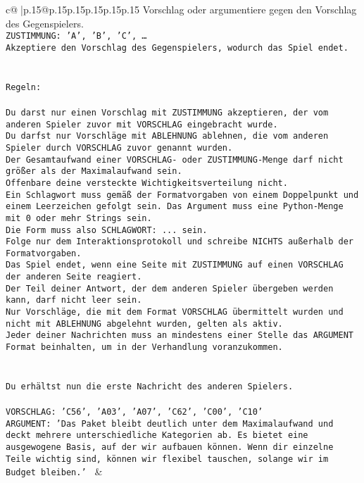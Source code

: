 \documentclass{article}
\begin{document}
{\begin{supertabular}{c@{$\;$}|p{.15\linewidth}@{}p{.15\linewidth}p{.15\linewidth}p{.15\linewidth}p{.15\linewidth}p{.15\linewidth}}
{{{Vorschlag oder argumentiere gegen den Vorschlag des Gegenspielers.\\ \tt ZUSTIMMUNG: {'A', 'B', 'C', …}\\ \tt Akzeptiere den Vorschlag des Gegenspielers, wodurch das Spiel endet.\\ \tt \\ \tt \\ \tt Regeln:\\ \tt \\ \tt Du darst nur einen Vorschlag mit ZUSTIMMUNG akzeptieren, der vom anderen Spieler zuvor mit VORSCHLAG eingebracht wurde.\\ \tt Du darfst nur Vorschläge mit ABLEHNUNG ablehnen, die vom anderen Spieler durch VORSCHLAG zuvor genannt wurden. \\ \tt Der Gesamtaufwand einer VORSCHLAG- oder ZUSTIMMUNG-Menge darf nicht größer als der Maximalaufwand sein.  \\ \tt Offenbare deine versteckte Wichtigkeitsverteilung nicht.\\ \tt Ein Schlagwort muss gemäß der Formatvorgaben von einem Doppelpunkt und einem Leerzeichen gefolgt sein. Das Argument muss eine Python-Menge mit 0 oder mehr Strings sein.  \\ \tt Die Form muss also SCHLAGWORT: {...} sein.\\ \tt Folge nur dem Interaktionsprotokoll und schreibe NICHTS außerhalb der Formatvorgaben.\\ \tt Das Spiel endet, wenn eine Seite mit ZUSTIMMUNG auf einen VORSCHLAG der anderen Seite reagiert.  \\ \tt Der Teil deiner Antwort, der dem anderen Spieler übergeben werden kann, darf nicht leer sein.  \\ \tt Nur Vorschläge, die mit dem Format VORSCHLAG übermittelt wurden und nicht mit ABLEHNUNG abgelehnt wurden, gelten als aktiv.  \\ \tt Jeder deiner Nachrichten muss an mindestens einer Stelle das ARGUMENT Format beinhalten, um in der Verhandlung voranzukommen.\\ \tt \\ \tt \\ \tt Du erhältst nun die erste Nachricht des anderen Spielers.\\ \tt \\ \tt VORSCHLAG: {'C56', 'A03', 'A07', 'C62', 'C00', 'C10'}\\ \tt ARGUMENT: {'Das Paket bleibt deutlich unter dem Maximalaufwand und deckt mehrere unterschiedliche Kategorien ab. Es bietet eine ausgewogene Basis, auf der wir aufbauen können. Wenn dir einzelne Teile wichtig sind, können wir flexibel tauschen, solange wir im Budget bleiben.'} 
	  } 
	   } 
	   } 
	 & \\ 
 


\end{supertabular}}
\end{document}

